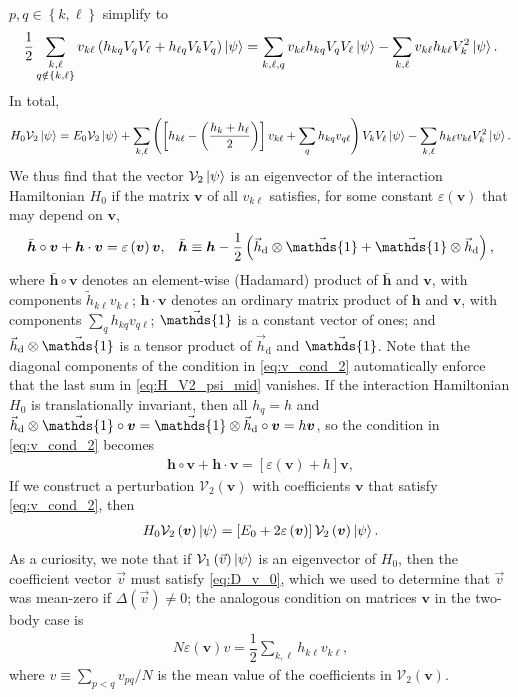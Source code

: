 \documentclass[nofootinbib,notitlepage,11pt]{revtex4-2}
\newcommand{\f}[2]{\dfrac{#1}{#2}} %
\newcommand{\p}[1]{\left(#1\right)} %
\renewcommand{\sp}[1]{\left[#1\right]} %
\renewcommand{\set}[1]{\left\{#1\right\}} %
\renewcommand{\c}{\cdot} %
\renewcommand{\oc}{\circ} %
\newcommand{\m}{\bm} %
\renewcommand{\v}{\vec} %
\newcommand{\1}{\mathds{1}}
\renewcommand{\d}{\text{d}}
\newcommand{\e}{\varepsilon}
\newcommand{\V}{\mathcal{V}}
\begin{document}
$p,q\in\set{k,\ell}$ simplify to
\begin{align}
  \f12 \sum_{\substack{k,\ell\\q\notin\set{k,\ell}}}
  v_{k\ell} \p{h_{kq} V_q V_\ell + h_{\ell q} V_k V_q} \ket\psi
  = \sum_{k,\ell,q} v_{k\ell} h_{kq} V_q V_\ell \ket\psi
  - \sum_{k,\ell} v_{k\ell} h_{k\ell} V_k^2 \ket\psi.
\end{align}
In total,
\begin{align}
  H_0 \V_2 \ket\psi
  = E_0 \V_2 \ket\psi
  + \sum_{k,\ell} \p{\sp{h_{k\ell}-\p{\f{h_k+h_\ell}{2}}} v_{k\ell}
    + \sum_q h_{kq} v_{q\ell}} V_k V_\ell \ket\psi
  - \sum_{k,\ell} h_{k\ell} v_{k\ell} V_k^2 \ket\psi.
  \label{eq:H_V2_psi_mid}
\end{align}
We thus find that the vector $\V_2\ket\psi$ is an eigenvector of the
interaction Hamiltonian $H_0$ if the matrix $\m v$ of all $v_{k\ell}$
satisfies, for some constant $\e\p{\m v}$ that may depend on $\m v$,
\begin{align}
  \bar{\m h}\oc\m v + \m h\c\m v = \e\p{\m v} \m v,
  &&
  \bar{\m h}
  \equiv \m h - \f12\p{\v h_\d\otimes\v\1 + \v\1\otimes\v h_\d},
  \label{eq:v_cond_2}
\end{align}
where $\bar{\m h}\oc\m v$ denotes an element-wise (Hadamard) product
of $\bar{\m h}$ and $\m v$, with components
$\tilde h_{k\ell} v_{k\ell}$; $\m h\c\m v$ denotes an ordinary matrix
product of $\m h$ and $\m v$, with components
$\sum_q h_{kq} v_{q\ell}$; $\v\1$ is a constant vector of ones; and
$\v h_\d\otimes\v\1$ is a tensor product of $\v h_\d$ and $\v\1$.
Note that the diagonal components of the condition in
\eqref{eq:v_cond_2} automatically enforce that the last sum in
\eqref{eq:H_V2_psi_mid} vanishes.  If the interaction Hamiltonian
$H_0$ is translationally invariant, then all $h_q=h$ and
$\v h_\d\otimes\v\1\oc\m v=\v\1\otimes\v h_\d\oc\m v=h\m v$, so the
condition in \eqref{eq:v_cond_2} becomes
\begin{align}
  \m h\oc\m v + \m h\c\m v = \sp{\e\p{\m v}+h} \m v,
\end{align}
If we construct a perturbation $\V_2\p{\m v}$ with coefficients $\m v$
that satisfy \eqref{eq:v_cond_2}, then
\begin{align}
  H_0 \V_2\p{\m v} \ket\psi
  = \sp{E_0 + 2\e\p{\m v}} \V_2\p{\m v} \ket\psi.
\end{align}
As a curiosity, we note that if $\V_1\p{\v v}\ket\psi$ is an
eigenvector of $H_0$, then the coefficient vector $\v v$ must satisfy
\eqref{eq:D_v_0}, which we used to determine that $\v v$ was mean-zero
if $\Delta\p{\v v}\ne0$; the analogous condition on matrices $\m v$ in
the two-body case is
\begin{align}
  N \e\p{\m v} v = \f12 \sum_{k,\ell} h_{k\ell} v_{k\ell},
\end{align}
where $v\equiv\sum_{p<q}v_{pq}/N$ is the mean value of the
coefficients in $\V_2\p{\m v}$.
\end{document}
